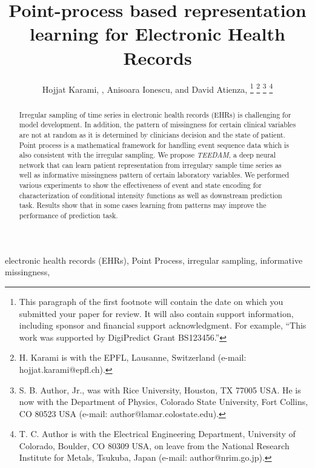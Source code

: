 \documentclass[journal,twoside,web]{ieeecolor}
\begin{document}
\title{Point-process based representation learning for Electronic Health Records}
\author{Hojjat Karami, , Anisoara Ionescu, and David Atienza, 
\thanks{This paragraph of the first footnote will contain the date on 
which you submitted your paper for review. It will also contain support 
information, including sponsor and financial support acknowledgment. For 
example, ``This work was supported by DigiPredict Grant BS123456.'' }
\thanks{H. Karami is with the EPFL, Lausanne, Switzerland (e-mail: hojjat.karami@epfl.ch). }
\thanks{S. B. Author, Jr., was with Rice University, Houston, TX 77005 USA. He is 
now with the Department of Physics, Colorado State University, Fort Collins, 
CO 80523 USA (e-mail: author@lamar.colostate.edu).}
\thanks{T. C. Author is with 
the Electrical Engineering Department, University of Colorado, Boulder, CO 
80309 USA, on leave from the National Research Institute for Metals, 
Tsukuba, Japan (e-mail: author@nrim.go.jp).}}

\maketitle


\begin{abstract}

    Irregular sampling of time series in electronic health records (EHRs) is challenging for model development. In addition, the pattern of missingness for certain clinical variables are not at random as it is determined by clinicians decision and the state of patient. Point process is a mathematical framework for handling event sequence data which is also consistent with the irregular sampling. We propose \emph{TEEDAM}, a deep neural network that can learn patient representation from irregulary sample time series as well as informative missingness pattern of certain laboratory variables. We performed various experiments to show the effectiveness of event and state encoding for characterization of conditional intensity functions as well as downstream prediction task. Results show that in some cases learning from patterns may improve the performance of prediction task.
\end{abstract}

\begin{IEEEkeywords}
    electronic health records (EHRs), Point Process, irregular sampling, informative missingness,
\end{IEEEkeywords}
\end{document}
